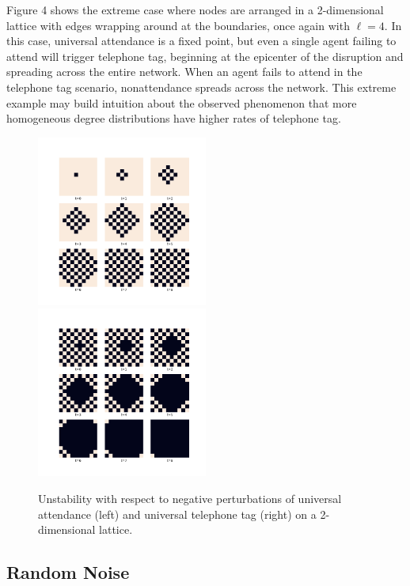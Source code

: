 \documentclass[12pt]{article}
\begin{document}
Figure 4 shows the extreme case where nodes are arranged in a 2-dimensional lattice with edges wrapping around at the boundaries, once again with $\ell = 4$.  In this case, universal attendance is a fixed point, but even a single agent failing to attend will trigger telephone tag, beginning at the epicenter of the disruption and spreading across the entire network.  When an agent fails to attend in the telephone tag scenario, nonattendance spreads across the network.  This extreme example may build intuition about the observed phenomenon that more homogeneous degree distributions have higher rates of telephone tag.   

\begin{figure}[h!]
\includegraphics[width=0.5\textwidth]{one_minus.png}
\includegraphics[width=0.5\textwidth]{alt_minus.png}
\caption{Unstability with respect to negative perturbations of universal attendance (left) and universal telephone tag (right) on a 2-dimensional lattice.}
\end{figure}

\subsection{Random Noise}
\end{document}
